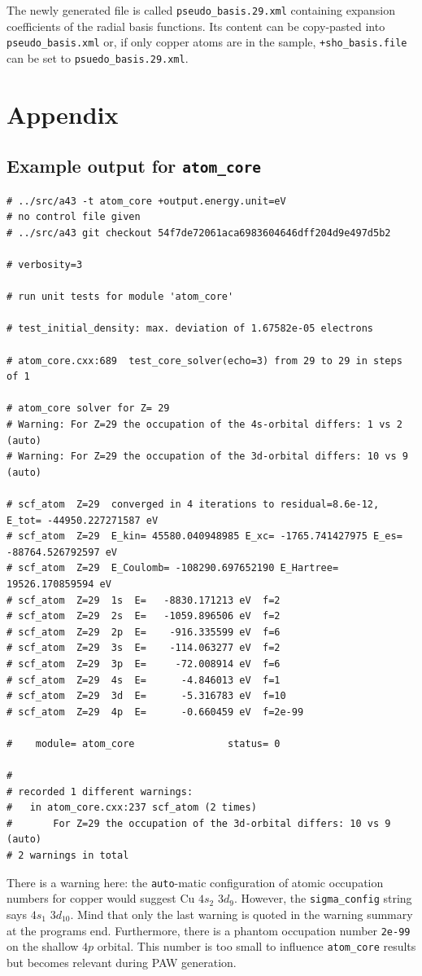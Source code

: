 \documentclass[oribibl]{llncs}
\newcommand{\ttt}[1]{\texttt{#1}}
\begin{document}
The newly generated file is called \ttt{pseudo\_basis.29.xml} containing expansion coefficients of
the radial basis functions. Its content can be copy-pasted into \ttt{pseudo\_basis.xml}
or, if only copper atoms are in the sample, \ttt{+sho\_basis.file} can be set to \ttt{psuedo\_basis.29.xml}.

\newpage

\appendix
%
\section{Appendix}
%
\subsection{Example output for \ttt{atom\_core}} \label{sec:example-output-for-atom-core}
\small
\begin{verbatim}
# ../src/a43 -t atom_core +output.energy.unit=eV
# no control file given
# ../src/a43 git checkout 54f7de72061aca6983604646dff204d9e497d5b2

# verbosity=3

# run unit tests for module 'atom_core'

# test_initial_density: max. deviation of 1.67582e-05 electrons

# atom_core.cxx:689  test_core_solver(echo=3) from 29 to 29 in steps of 1

# atom_core solver for Z= 29
# Warning: For Z=29 the occupation of the 4s-orbital differs: 1 vs 2 (auto)
# Warning: For Z=29 the occupation of the 3d-orbital differs: 10 vs 9 (auto)

# scf_atom  Z=29  converged in 4 iterations to residual=8.6e-12, E_tot= -44950.227271587 eV
# scf_atom  Z=29  E_kin= 45580.040948985 E_xc= -1765.741427975 E_es= -88764.526792597 eV
# scf_atom  Z=29  E_Coulomb= -108290.697652190 E_Hartree= 19526.170859594 eV
# scf_atom  Z=29  1s  E=   -8830.171213 eV  f=2
# scf_atom  Z=29  2s  E=   -1059.896506 eV  f=2
# scf_atom  Z=29  2p  E=    -916.335599 eV  f=6
# scf_atom  Z=29  3s  E=    -114.063277 eV  f=2
# scf_atom  Z=29  3p  E=     -72.008914 eV  f=6
# scf_atom  Z=29  4s  E=      -4.846013 eV  f=1
# scf_atom  Z=29  3d  E=      -5.316783 eV  f=10
# scf_atom  Z=29  4p  E=      -0.660459 eV  f=2e-99

#    module= atom_core                status= 0

#
# recorded 1 different warnings:
# 	in atom_core.cxx:237 scf_atom (2 times)
# 		For Z=29 the occupation of the 3d-orbital differs: 10 vs 9 (auto)
# 2 warnings in total
\end{verbatim}
\normalsize
%
\noindent
There is a warning here: the \ttt{auto}-matic configuration of atomic occupation numbers
for copper would suggest Cu $4s_{2}$ $3d_{9}$. However, the \ttt{sigma\_config} string
says $4s_{1}$ $3d_{10}$.
Mind that only the last warning is quoted in the warning summary at the programs end.
Furthermore, there is a phantom occupation number \ttt{2e-99} on the shallow $4p$ orbital.
This number is too small to influence \ttt{atom\_core} results but becomes relevant during \ac{PAW} generation.
\end{document}
